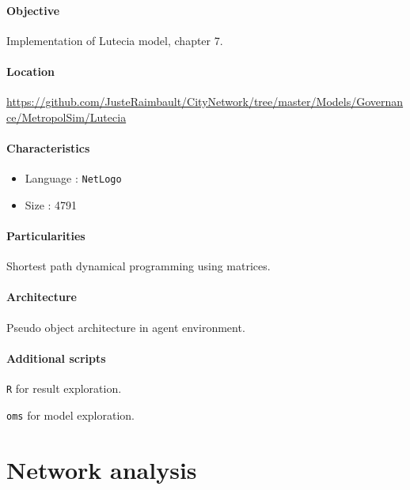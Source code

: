 \paragraph{Objective}

Implementation of Lutecia model, chapter 7.

\paragraph{Location}

\url{https://github.com/JusteRaimbault/CityNetwork/tree/master/Models/Governance/MetropolSim/Lutecia}

\paragraph{Characteristics}

\begin{itemize}
\item Language : \texttt{NetLogo}
\item Size : 4791
\end{itemize}


\paragraph{Particularities}

Shortest path dynamical programming using matrices.

\paragraph{Architecture}

Pseudo object architecture in agent environment.

\paragraph{Additional scripts}

\texttt{R} for result exploration.

\texttt{oms} for model exploration.






\section{Network analysis}

